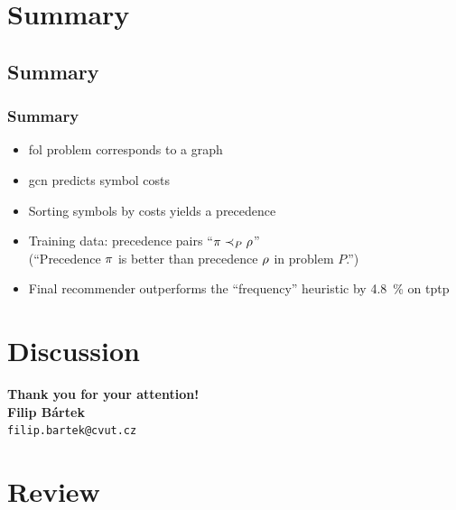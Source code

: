 \documentclass[a4paper]{beamer}
\makeatletter
\newcommand\Email{filip.bartek@cvut.cz}
\makeatother
\begin{document}
\section{Summary}
\subsection*{Summary}
\begin{frame}
\frametitle{Summary}
\begin{itemize}
\item \Acrfull{fol} problem corresponds to a graph
\item \Acrfull{gcn} predicts symbol costs
\item Sorting symbols by costs yields a precedence
\item Training data: precedence pairs ``$\pi \prec_{P} \rho$'' \\
(``Precedence $\pi$ is better than precedence $\rho$ in problem $P$.'')
\item Final recommender outperforms the ``frequency'' heuristic by \SI{4.8}{\percent} on \acrshort{tptp}
\end{itemize}
\end{frame}

\section*{Discussion}
\begin{frame}
\begin{center}
\vspace*{1cm}
{\bf Thank you for your attention!}\\
\vspace*{2cm}
{\bf\Large Filip Bártek}\\
{\tt \Email}
\vspace*{1cm}
\end{center}

\end{frame}
%
\appendix

\section{Review}

\end{document}
